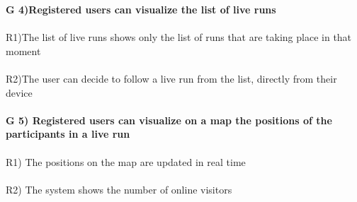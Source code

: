 \textbf{G 4)Registered users can visualize the list of live runs} \\ \\
R1)The list of live runs shows only the list of runs that are taking place in that moment \\ \\
R2)The user can decide to follow a live run from the list, directly from their device \\ \\
\textbf{G 5) Registered users can visualize on a map the positions of the participants in a live run} \\ \\	
R1) The positions on the map are updated in real time \\ \\
R2) The system shows the number of online visitors \\


